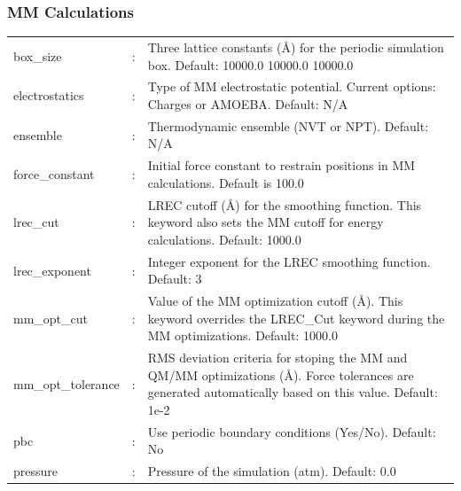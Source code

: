 \documentclass[12pt]{report}
\begin{document}
\subsubsection{MM Calculations}
\begin{center}
\begin{longtable}{ p{4cm} c p{12.5cm}}
box\_size & : & Three lattice constants (\AA) for the periodic simulation box.
Default: 10000.0 10000.0 10000.0 \newline \\

electrostatics & : & Type of MM electrostatic potential.
Current options: Charges or AMOEBA.
Default: N/A \newline\\

ensemble & : & Thermodynamic ensemble (NVT or NPT).
Default: N/A \newline\\

force\_constant & : & 
Initial force constant to restrain 
positions in MM calculations. 
Default is 100.0\newline \\

lrec\_cut & : & LREC cutoff (\AA) for the smoothing function.
This keyword also sets the MM cutoff for energy calculations.
Default: 1000.0 \newline\\

lrec\_exponent & : & Integer exponent for the LREC smoothing function.
Default: 3 \newline\\

mm\_opt\_cut & : & Value of the MM optimization cutoff (\AA).
This keyword overrides the LREC\_Cut keyword during the MM optimizations.
Default: 1000.0 \newline\\

mm\_opt\_tolerance & : & RMS deviation criteria for stoping the MM and QM/MM
optimizations (\AA).
Force tolerances are generated automatically based on this value.
Default: 1e-2 \newline\\

pbc & : & Use periodic boundary conditions (Yes/No).
Default: No \newline\\

pressure & : & Pressure of the simulation (atm).
Default: 0.0 \newline\\


\end{longtable}
\end{center}
\end{document}
